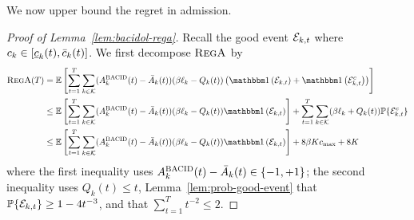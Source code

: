 We now upper bound the regret in admission.
\begin{proof}[Proof of Lemma~\ref{lem:bacidol-rega}]
Recall the good event $\mathcal{E}_{k,t}$ where $c_k \in [\underline{c}_k(t),\bar{c}_k(t)]$. We first decompose $\textsc{RegA}$ by
\begin{align}
\textsc{RegA}(T) &= \expect{\sum_{t=1}^T \sum_{k\in\set{K}} (A_k^{\bacid}(t) - \bar{A}_k(t))(\beta \ell_k-Q_k(t))\left(\indic{\set{E}_{k,t}} + \indic{\set{E}_{k,t}^c}\right)} \nonumber\\
&\leq\expect{\sum_{t=1}^T \sum_{k\in\set{K}} (A_k^{\bacid}(t) - \bar{A}_k(t))(\beta \ell_k-Q_k(t))\indic{\set{E}_{k,t}}} + \sum_{t=1}^T \sum_{k \in \set{K}} (\beta \ell_k + Q_k(t))\Pr\{\set{E}_{k,t}^c\} \nonumber\\
&\leq \expect{\sum_{t=1}^T \sum_{k\in\set{K}} (A_k^{\bacid}(t) - \bar{A}_k(t))(\beta \ell_k-Q_k(t))\indic{\set{E}_{k,t}}} + 8\beta K c_{\max}+8K \label{eq:bacidol-regA-decomp}
\end{align}
where the first inequality uses $A_k^{\textsc{BACID}}(t) - \bar{A}_k(t) \in \{-1,+1\}$; the second inequality uses $Q_k(t) \leq t$, Lemma~\ref{lem:prob-good-event} that $\mathbb{P}\{\mathcal{E}_{k,t}\} \geq 1 - 4t^{-3}$, and that $\sum_{t=1}^T t^{-2} \leq 2$. 


\end{proof}
